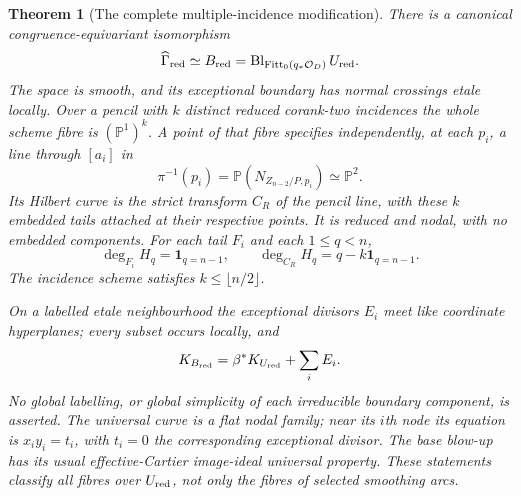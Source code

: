 \documentclass[11pt,reqno]{amsart}
\numberwithin{equation}{section}
\newtheorem{theorem}{Theorem}[section]
\theoremstyle{definition}\newtheorem{definition}[theorem]{Definition}
\theoremstyle{remark}\newtheorem{remark}[theorem]{Remark}
\newcommand{\Pj}{\mathbb P}\newcommand{\A}{\mathbb A}
\newcommand{\OO}{\mathcal O}\newcommand{\II}{\mathcal I}
\DeclareMathOperator{\Fitt}{Fitt}\DeclareMathOperator{\Ann}{Ann}
\begin{document}
\begin{theorem}[The complete multiple-incidence modification]
\label{thm:multiple-incidence-v161}
There is a canonical congruence-equivariant isomorphism
\begin{equation}\label{eq:global-multiple-v161}
 \widehat\Gamma_{\rm red}\simeq B_{\rm red}
                =\operatorname{Bl}_{\Fitt_0(q_*\OO_D)}U_{\rm red}.
\end{equation}
The space is smooth, and its exceptional boundary has normal crossings
etale locally. Over a pencil with $k$ distinct reduced corank-two
incidences the whole scheme fibre is $(\Pj^1)^k$. A point of that fibre
specifies independently, at each $p_i$, a line through $[a_i]$ in
\[
 \pi^{-1}(p_i)=\Pj(N_{Z_{n-2}/P,p_i})\simeq\Pj^2.
\]
Its Hilbert curve is the strict transform $C_R$ of the pencil line,
with these $k$ embedded tails attached at their respective points.
It is reduced and nodal, with no embedded components. For each tail
$F_i$ and each $1\leq q<n$,
\begin{equation}\label{eq:multiple-degrees-v161}
 \deg_{F_i}H_q=\mathbf1_{q=n-1},\qquad
 \deg_{C_R}H_q=q-k\mathbf1_{q=n-1}.
\end{equation}
The incidence scheme satisfies $k\leq\lfloor n/2\rfloor$.

On a labelled etale neighbourhood the exceptional divisors $E_i$
meet like coordinate hyperplanes; every subset occurs locally, and
\[
 K_{B_{\rm red}}=\beta^*K_{U_{\rm red}}+\sum_i E_i.
\]
No global labelling, or global simplicity of each irreducible boundary
component, is asserted. The universal curve is a flat nodal family;
near its $i$th node its equation is $x_i y_i=t_i$, with $t_i=0$
the corresponding exceptional divisor. The base blow-up has its
usual effective-Cartier image-ideal universal property. These
statements classify all fibres over $U_{\rm red}$, not only the fibres
of selected smoothing arcs.
\end{theorem}
\end{document}
